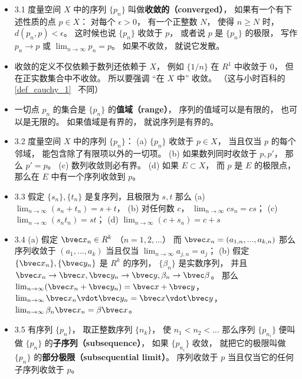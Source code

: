\begin{itemize}
\item 3.1 度量空间 $X$ 中的序列 $\{p_n\}$ 叫做\textbf{收敛的（converged）}， 如果有一个有下述性质的点 $p\in X$： 对每个 $\epsilon > 0$， 有一个正整数 $N$， 使得 $n \geqslant N$ 时， $d(p_n,p) < \epsilon$。 这时候也说 $\{p_n\}$ 收敛于 $p$， 或者说 $p$ 是 $\{p_n\}$ 的极限， 写作 $p_n\to p$ 或 $\lim_{n\to \infty} p_n = p$。 如果不收敛， 就说它发散。

\item 收敛的定义不仅依赖于数列还依赖于 $X$， 例如 $\{1/n\}$ 在 $R^1$ 中收敛于 $0$， 但在正实数集合中不收敛。 所以要强调 “在 $X$ 中” 收敛。 （这与小时百科的\autoref{def_cauchy_1}~ 不同）

\item 一切点 $p_n$ 的集合是 $\{p_n\}$ 的\textbf{值域（range）}， 序列的值域可以是有限的， 也可以是无限的。 如果值域是有界的， 就说序列是有界的。

\item 3.2 度量空间 $X$ 中的序列 $\{p_n\}$： (a) $\{p_n\}$ 收敛于 $p\in X$， 当且仅当 $p$ 的每个邻域， 能包含除了有限项以外的一切项。 (b) 如果数列同时收敛于 $p, p'$， 那么 $p' = p$。 (c) 数列收敛则必有界。 (d) 如果 $E \subset X$， 而 $p$ 是 $E$ 的极限点， 那么在 $E$ 中有一个序列收敛到 $p$。

\item 3.3 假定 $\{s_n\}, \{t_n\}$ 是复序列，且极限为 $s, t$ 那么 (a) $\lim_{n\to\infty} (s_n+t_n) = s+t$， (b) 对任何数 $c$， $\lim_{n\to\infty}cs_n = cs$； (c) $\lim_{n\to\infty}(s_n t_n) = st$； (d) $\lim_{n\to\infty} (c+s_n) = c+s$

\item 3.4 (a) 假定 $\bvec x_n \in R^k$ （$n=1,2,...$） 而 $\bvec x_n = (a_{1,n}, ...,a_{k,n})$ 那么序列收敛于 $(a_1,...,a_k)$ 当且仅当 $\lim_{n\to\infty} a_{j,n} = a_j$； (b) 假定 $\{\bvec x_n\}, \{\bvec y_n\}$ 是 $R^k$ 的序列， $\{\beta_n\}$ 是实数序列， 并且 $\bvec x_n\to \bvec x, \bvec y_n\to \bvec y, \beta_n\to\bvec \beta$。 那么 $\lim_{n\to\infty} (\bvec x_n+\bvec y_n) = \bvec x+\bvec y$， $\lim_{n\to\infty} \bvec x_n \vdot \bvec y_n = \bvec x \vdot \bvec y$， $\lim_{n\to\infty} \beta_n \bvec x_n = \beta \bvec x$。

\item 3.5 有序列 $\{p_n\}$， 取正整数序列 $\{n_k\}$， 使 $n_1<n_2<...$ 那么序列 $\{p_{n_i}\}$ 便叫做 $\{p_n\}$ 的\textbf{子序列（subsequence）}， 如果 $\{p_{n_i}\}$ 收敛， 就把它的极限叫做 $\{p_n\}$ 的\textbf{部分极限（subsequential limit）}。 序列收敛于 $p$ 当且仅当它的任何子序列收敛于 $p$。


\end{itemize}
